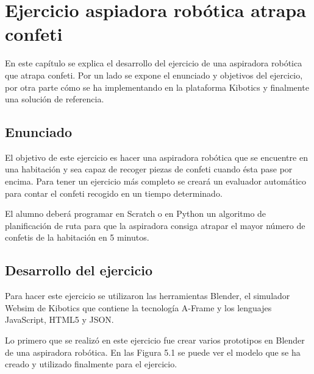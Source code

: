 \chapter{Ejercicio aspiadora robótica atrapa confeti}\label{chap:aspiradora}
En este capítulo se explica el desarrollo del ejercicio de una aspiradora robótica que atrapa confeti. Por un lado se expone el enunciado y objetivos del ejercicio, por otra parte cómo se ha implementando en la plataforma Kibotics y finalmente una solución de referencia.


\section{Enunciado}
El objetivo de este ejercicio es hacer una aspiradora robótica que se encuentre en una habitación y sea capaz de recoger piezas de confeti cuando ésta pase por encima. Para tener un ejercicio más completo se creará un evaluador automático para contar el confeti recogido en un tiempo determinado.

El alumno deberá programar en Scratch o en Python un algoritmo de planificación de ruta para que la aspiradora consiga atrapar el mayor número de confetis de la habitación en 5 minutos.

\section{Desarrollo del ejercicio}
Para hacer este ejercicio se utilizaron las herramientas Blender, el simulador Websim de Kibotics que contiene la tecnología A-Frame y los lenguajes JavaScript, HTML5 y JSON.

Lo primero que se realizó en este ejercicio fue crear varios prototipos en Blender de una aspiradora robótica. En las Figura 5.1 se puede ver el modelo que se ha creado y utilizado finalmente para el ejercicio.
 
